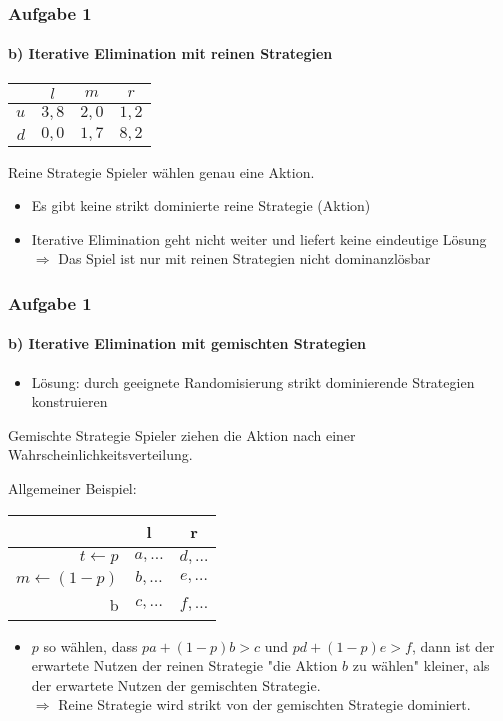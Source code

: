 \documentclass{beamer}
\begin{document}
\begin{frame}
	\frametitle{Aufgabe 1}
	\framesubtitle{b) Iterative Elimination mit reinen Strategien}

	\centering
	\begin{tabular}{r|c|c|c|}
		& $l$ & $m$ & $r$ \\
		\hline
		$u$ & $3, 8$ & $2, 0$ & $1, 2$ \\
		$d$ & $0, 0$ & $1, 7$ & $8, 2$ \\
		\hline
	\end{tabular}

	\begin{block}{Reine Strategie}
		Spieler wählen genau eine Aktion.
	\end{block}

	\begin{itemize}
		\item Es gibt keine strikt dominierte reine Strategie (Aktion) 
		\item Iterative Elimination  geht nicht weiter und liefert keine eindeutige Lösung\\
		$\Rightarrow$ Das Spiel ist nur mit reinen Strategien nicht dominanzlösbar
	\end{itemize}

\end{frame}

\begin{frame}
	\frametitle{Aufgabe 1}
	\framesubtitle{b) Iterative Elimination mit gemischten Strategien}

	\centering

	\begin{itemize}
		\item Lösung: durch geeignete Randomisierung strikt dominierende Strategien konstruieren
	\end{itemize}

\begin{block}{Gemischte Strategie}
		Spieler ziehen die Aktion nach einer Wahrscheinlichkeitsverteilung.
	\end{block}

	Allgemeiner Beispiel:

	\begin{tabular}{r|c|c|}
		& l & r \\
		\hline
		$t \leftarrow p$ & $a, \dots$ & $d, \dots$ \\
		$m \leftarrow (1 - p)$ & $b, \dots$ & $e, \dots$ \\
		b & $c, \dots$ & $f, \dots$ \\
		\hline
	\end{tabular}

	\begin{itemize}
		\item $p$ so wählen, dass $pa + (1-p)b > c$ und $pd + (1-p)e > f$, dann ist der erwartete Nutzen der reinen Strategie "die Aktion $b$ zu wählen" kleiner, als der erwartete Nutzen der gemischten Strategie.\\
		$\Rightarrow$ Reine Strategie wird strikt von der gemischten Strategie dominiert.
	\end{itemize}
\end{frame}
\end{document}
